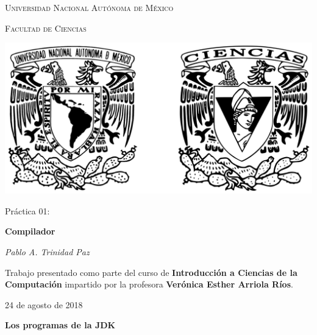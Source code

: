 \documentclass[11pt,letterpaper]{article}
\begin{document}
\begin{titlepage}
    \centering

    {\scshape\LARGE Universidad Nacional Autónoma de México \par}

    \vspace{1cm}
    {\scshape\Large Facultad de Ciencias\par}
    \vspace{1.5cm}

    \begin{center}
        \includegraphics[scale=.1]{../../assets/img/logo.png}
    \end{center}

    \vspace{.8 cm}

    {\LARGE Práctica 01: \par}
    {\huge\bfseries Compilador \par}

    \vspace{0.5cm}
    {\large\itshape Pablo A. Trinidad Paz\par}

    \vfill

    Trabajo presentado como parte del curso de \textbf{Introducción a Ciencias de la Computación}
    impartido por la profesora \textbf{Verónica Esther Arriola Ríos}. \par
    \vspace{0.1cm}
    {\large 24 de agosto de 2018\par}
\end{titlepage}

{\Large \bfseries Los programas de la JDK \par}
\end{document}
